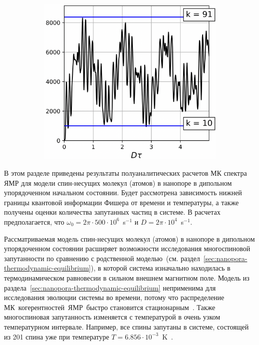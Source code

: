 \begin{figure}[h]
\begin{subfigure}[t]{0.3\textwidth}
    \caption{\protect}
    \label{fig:result-nanopore-do-m2-by-time-n101-beta2}
  \end{subfigure}
  \hfill
  \begin{subfigure}[t]{0.3\textwidth}
    \centering
    \includegraphics[width=\textwidth]{figures/result-nanopore-do-m2-by-time-n101-beta3.png}
    \caption{\protect}
    \label{fig:result-nanopore-do-m2-by-time-n101-beta3}
  \end{subfigure}
  \caption{\protect}
  \label{fig:result-nanopore-do-m2-by-time-n101-betas}
\end{figure}

В этом разделе приведены результаты полуаналитических расчетов МК спектра ЯМР
для модели спин-несущих молекул (атомов) в нанопоре в дипольном упорядоченном начальном состоянии.
Будет рассмотрена зависимость нижней границы квантовой информации Фишера от времени и температуры,
а также получены оценки количества запутанных частиц в системе.
В расчетах предполагается, что $\omega_{0} = 2\pi \cdot 500 \cdot 10^{6}$~s$^{-1}$ и $D = 2\pi \cdot 10^{4}$~s$^{-1}$.

Рассматриваемая модель спин-несущих молекул (атомов) в нанопоре в дипольном упорядоченном состоянии
расширяет возможности исследования многоспиновой запутанности по сравнению с родственной моделью~(см. раздел~\ref{sec:nanopora-thermodynamic-equilibrium}),
в которой система изначально находилась в термодинамическом равновесии в сильном внешнем магнитном поле.
Модель из раздела~\ref{sec:nanopora-thermodynamic-equilibrium} неприменима для исследования эволюции системы во времени,
потому что распределение МК~когерентностей~ЯМР~быстро становится стационарным~\cite{Doronin2009}.
Также многоспиновая запутанность изменяется с температурой в очень узком температурном интервале.
Например, все спины запутаны в системе, состоящей из 201 спина уже при температуре $T=6.856\cdot10^{-3}$~K~\cite{Doronin2019}.

